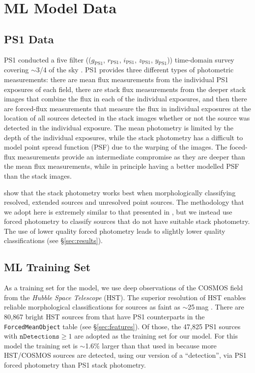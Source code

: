 \documentclass[twocolumn]{aastex63}
\begin{document}
\section{ML Model Data}

\subsection{PS1 Data}

PS1 conducted a five filter (($g_\mathrm{PS1}$, $r_\mathrm{PS1}$,
$i_\mathrm{PS1}$, $z_\mathrm{PS1}$, $y_\mathrm{PS1}$)) time-domain survey
covering $\sim$3/4 of the sky \citep{Chambers16}. PS1 provides three different
types of photometric measurements: there are mean flux measurements from the
individual PS1 exposures of each field, there are stack flux measurements from
the deeper stack images that combine the flux in each of the individual
exposures, and then there are forced-flux measurements that measure the flux
in individual exposures at the location of all sources detected in the stack
images whether or not the source was detected in the individual exposure. The
mean photometry is limited by the depth of the individual exposures, while the
stack photometry has a difficult to model point spread function (PSF) due to
the warping of the images. The foced-flux measurements provide an intermediate
compromise as they are deeper than the mean flux measurements, while in
principle having a better modelled PSF than the stack images.

\citet{Tachibana18} show that the stack photometry works best when
morphologically classifying resolved, extended sources and unresolved point
sources. The methodology that we adopt here is extremely similar to that
presented in \citep{Tachibana18}, but we instead use forced photometry to
classify sources that do not have suitable stack photometry. The use of lower
quality forced photometry leads to slightly lower quality classifications (see
\S\ref{sec:results}).

\subsection{ML Training Set}\label{sec:training_set}

As a training set for the model, we use deep observations of the COSMOS field
from the \textit{Hubble Space Telescope} (HST). The superior
resolution of HST enables reliable morphological classifications for
sources as faint as $\sim$25\,mag \citep{Leauthaud07}. There are 80,867 bright
HST sources from \citet{Leauthaud07} that have PS1 counterparts
\citep[within a 1\arcsec match radius; see][]{Tachibana18} in the
\texttt{ForcedMeanObject} table (see \S\ref{sec:features}). Of those, the
47,825 PS1 sources with $\mathtt{nDetections} \ge 1$ are adopted as the
training set for our model. For this model the training set is $\sim$1.6\%
larger than that used in \citet{Tachibana18} because more HST/COSMOS sources
are detected, using our version of a ``detection'', via PS1 forced photometry
than PS1 stack photometry.
\end{document}
